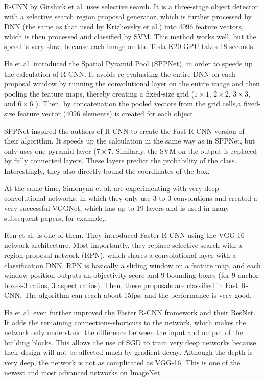 R-CNN by Girshick et al.\cite{girshick_rich_2014} uses selective search. It is a three-stage object detector with a selective search region proposal generator, which is further processed by DNN (the same as that used by Krizhevsky et al.\cite{krizhevsky_imagenet_2017}) into 4096 feature vectors, which is then processed and classified by SVM. This method works well, but the speed is very slow, because each image on the Tesla K20 GPU takes 18 seconds.

He et al.\cite{he_spatial_2014} introduced the Spatial Pyramid Pool (SPPNet), in order to speeds up the calculation of R-CNN. It avoids re-evaluating the entire DNN on each proposal window by running the convolutional layer on the entire image and then pooling the feature maps, thereby creating a fixed-size grid (\(1\times1\), \(2\times2\), \(3\times3\), and \(6\times6\) ). Then, by concatenation the pooled vectors from the grid cells,a fixed-size feature vector (4096 elements) is created for each object. 

SPPNet inspired the authors of R-CNN to create the Fast R-CNN\cite{ren_faster_2016} version of their algorithm. It speeds up the calculation in the same way as in SPPNet, but only uses one pyramid layer (\(7\times7\). Similarly, the SVM on the output is replaced by fully connected layers. These layers predict the probability of the class. Interestingly, they also directly bound the coordinates of the box.

At the same time, Simonyan et al. are experimenting with very deep convolutional networks\cite{simonyan_very_2015}, in which they only use 3 to 3 convolutions and created a very successful VGGNet, which has up to 19 layers and is used in many subsequent papers, for example,\cite{ren_faster_2016,chen_3d_nodate}.

Ren et al. is one of them. They introduced Faster R-CNN\cite{ren_faster_2016} using the VGG-16 network architecture. Most importantly, they replace selective search with a region proposal network (RPN), which shares a convolutional layer with a classification DNN. RPN is basically a sliding window on a feature map, and each window position outputs an objectivity score and 9 bounding boxes (for 9 anchor boxes-3 ratios, 3 aspect ratios). Then, these proposals are classified in Fast R-CNN. The algorithm can reach about 15fps, and the performance is very good. 

He et al. even further improved the Faster R-CNN framework\cite{he_deep_2015} and their ResNet. It adds the remaining connections-shortcuts to the network, which makes the network only understand the difference between the input and output of the building blocks. This allows the use of SGD to train very deep networks because their design will not be affected much by gradient decay. Although the depth is very deep, the network is not as complicated as VGG-16\cite{simonyan_very_2015}. This is one of the newest and most advanced networks on ImageNet.
